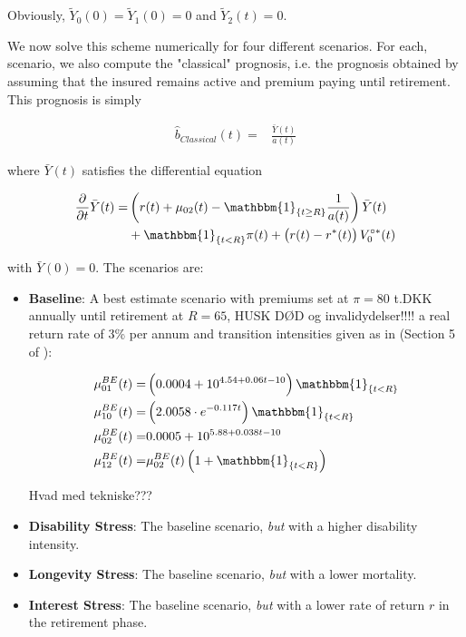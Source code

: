 \documentclass{book}
\newcommand{\1}[1]{\mathbbm{1}_{\left\lbrace #1 \right\rbrace}}
\theoremstyle{break}
\theoremstyle{remark}
\numberwithin{equation}{section}
\begin{document}
Obviously, $\tilde{Y}_0(0)=\tilde{Y}_1(0)=0$ and $\tilde{Y}_2(t)=0$.

We now solve this scheme numerically for four different scenarios. For each, scenario, we also compute the "classical" prognosis, i.e. the prognosis obtained by assuming that the insured remains active and premium paying until retirement. This prognosis is simply

\begin{align*}
	\hat{b}_{Classical}(t) =& \frac{\bar{Y}(t)}{a(t)}
\end{align*}

where $\bar{Y}(t)$ satisfies the differential equation

\begin{align*}
	\frac{\partial}{\partial t} \bar{Y}(t) =& \left( r(t) + \mu_{02}(t) - \1{t \geq R} \frac{1}{a(t)}\right) \bar{Y}(t) \\
	&+ \1{t<R} \pi(t) + \left( r(t) - r^*(t) \right) V_{0}^{\circ*}(t)
\end{align*}

with $\bar{Y}(0) = 0$. The scenarios are:

\begin{itemize}
	\item \textbf{Baseline}: A best estimate scenario with premiums set at $\pi = 80$ t.DKK annually until retirement at $R=65$, HUSK DØD og invalidydelser!!!! a real return rate of 3\% per annum and transition intensities given as in (Section 5 of \cite{BuchardtMoller}):
	
	\begin{align*}
		\mu_{01}^{BE}(t) =& \left(0.0004 + 10^{4.54 + 0.06t - 10}\right) \1{t<R} \\
		\mu_{10}^{BE}(t) =& \left(2.0058 \cdot e^{-0.117t}\right) \1{t<R} \\
		\mu_{02}^{BE}(t) =& 0.0005 + 10^{5.88 + 0.038t - 10} \\
		\mu_{12}^{BE}(t) =& \mu_{02}^{BE}(t) \left( 1 + \1{t<R} \right)
	\end{align*}

	Hvad med tekniske???
	
	\item \textbf{Disability Stress}: The baseline scenario, \textit{but} with a higher disability intensity.
	\item \textbf{Longevity Stress}: The baseline scenario, \textit{but} with a lower mortality.
	\item \textbf{Interest Stress}: The baseline scenario, \textit{but} with a lower rate of return $r$ in the retirement phase.
\end{itemize}
\end{document}
